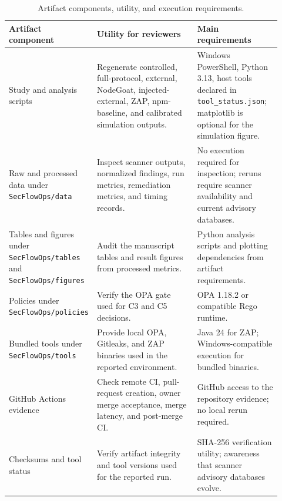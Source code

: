 \begin{table}[t]
\centering
\footnotesize
\caption{Artifact components, utility, and execution requirements.}
\label{tab:artifact-scope}
\begin{tabular}{@{}p{0.23\linewidth}p{0.38\linewidth}p{0.31\linewidth}@{}}
\toprule
Artifact component & Utility for reviewers & Main requirements \\
\midrule
Study and analysis scripts & Regenerate controlled, full-protocol, external, NodeGoat, injected-external, ZAP, npm-baseline, and calibrated simulation outputs. & Windows PowerShell, Python 3.13, host tools declared in \texttt{tool\_status.json}; matplotlib is optional for the simulation figure. \\
Raw and processed data under \texttt{SecFlowOps/data} & Inspect scanner outputs, normalized findings, run metrics, remediation metrics, and timing records. & No execution required for inspection; reruns require scanner availability and current advisory databases. \\
Tables and figures under \texttt{SecFlowOps/tables} and \texttt{SecFlowOps/figures} & Audit the manuscript tables and result figures from processed metrics. & Python analysis scripts and plotting dependencies from artifact requirements. \\
Policies under \texttt{SecFlowOps/policies} & Verify the OPA gate used for C3 and C5 decisions. & OPA 1.18.2 or compatible Rego runtime. \\
Bundled tools under \texttt{SecFlowOps/tools} & Provide local OPA, Gitleaks, and ZAP binaries used in the reported environment. & Java 24 for ZAP; Windows-compatible execution for bundled binaries. \\
GitHub Actions evidence & Check remote CI, pull-request creation, owner merge acceptance, merge latency, and post-merge CI. & GitHub access to the repository evidence; no local rerun required. \\
Checksums and tool status & Verify artifact integrity and tool versions used for the reported run. & SHA-256 verification utility; awareness that scanner advisory databases evolve. \\
\bottomrule
\end{tabular}
\end{table}
